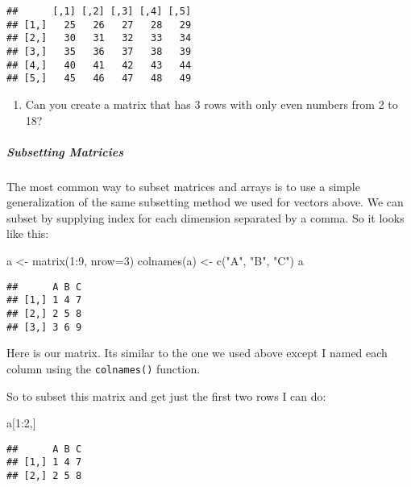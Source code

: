 \documentclass[
]{article}
\newenvironment{Shaded}{\begin{snugshade}}{\end{snugshade}}
\newcommand{\AttributeTok}[1]{\textcolor[rgb]{0.77,0.63,0.00}{#1}}
\newcommand{\DecValTok}[1]{\textcolor[rgb]{0.00,0.00,0.81}{#1}}
\newcommand{\FunctionTok}[1]{\textcolor[rgb]{0.00,0.00,0.00}{#1}}
\newcommand{\NormalTok}[1]{#1}
\newcommand{\OtherTok}[1]{\textcolor[rgb]{0.56,0.35,0.01}{#1}}
\newcommand{\SpecialCharTok}[1]{\textcolor[rgb]{0.00,0.00,0.00}{#1}}
\newcommand{\StringTok}[1]{\textcolor[rgb]{0.31,0.60,0.02}{#1}}
\providecommand{\tightlist}{%
  \setlength{\itemsep}{0pt}\setlength{\parskip}{0pt}}
\begin{document}
\begin{verbatim}
##      [,1] [,2] [,3] [,4] [,5]
## [1,]   25   26   27   28   29
## [2,]   30   31   32   33   34
## [3,]   35   36   37   38   39
## [4,]   40   41   42   43   44
## [5,]   45   46   47   48   49
\end{verbatim}

\begin{enumerate}
\def\labelenumi{(\arabic{enumi})}
\setcounter{enumi}{5}
\tightlist
\item
  Can you create a matrix that has 3 rows with only even numbers from 2
  to 18?
\end{enumerate}

\hypertarget{subsetting-matricies}{%
\subparagraph{Subsetting Matricies}\label{subsetting-matricies}}

The most common way to subset matrices and arrays is to use a simple
generalization of the same subsetting method we used for vectors above.
We can subset by supplying index for each dimension separated by a
comma. So it looks like this:

\begin{Shaded}
\begin{Highlighting}[]
\NormalTok{a }\OtherTok{\textless{}{-}} \FunctionTok{matrix}\NormalTok{(}\DecValTok{1}\SpecialCharTok{:}\DecValTok{9}\NormalTok{, }\AttributeTok{nrow=}\DecValTok{3}\NormalTok{)}
\FunctionTok{colnames}\NormalTok{(a) }\OtherTok{\textless{}{-}} \FunctionTok{c}\NormalTok{(}\StringTok{"A"}\NormalTok{, }\StringTok{"B"}\NormalTok{, }\StringTok{"C"}\NormalTok{)}
\NormalTok{a}
\end{Highlighting}
\end{Shaded}

\begin{verbatim}
##      A B C
## [1,] 1 4 7
## [2,] 2 5 8
## [3,] 3 6 9
\end{verbatim}

Here is our matrix. Its similar to the one we used above except I named
each column using the \texttt{colnames()} function.

So to subset this matrix and get just the first two rows I can do:

\begin{Shaded}
\begin{Highlighting}[]
\NormalTok{a[}\DecValTok{1}\SpecialCharTok{:}\DecValTok{2}\NormalTok{,]}
\end{Highlighting}
\end{Shaded}

\begin{verbatim}
##      A B C
## [1,] 1 4 7
## [2,] 2 5 8
\end{verbatim}
\end{document}
